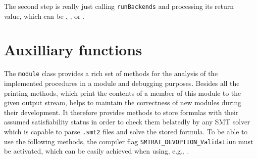 The second step is really just calling \texttt{runBackends} and processing its return value, which can be
\True, \False, or \Unknown.

\section{Auxilliary functions}
\label{sec:auxfunctions}
The \texttt{module} class provides a rich set of methods for the analysis of the implemented procedures in a module and debugging purposes. 
Besides all the printing methods, which print the contents of a member of this module to the given output stream, \smtrat helps to maintain the correctness of new modules during their development. It therefore provides methods to store formulas with their assumed satisfiability status in order
to check them belatedly by any SMT solver which is capable to parse \texttt{.smt2} files and solve
the stored formula. To be able to use the following methods, the compiler flag \texttt{SMTRAT\_DEVOPTION\_Validation}
must be activated, which can be easily achieved when using, e.g., \ccmake.

